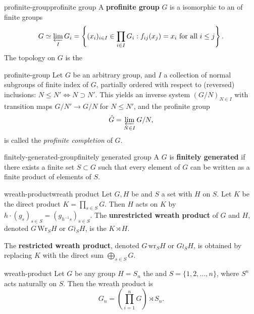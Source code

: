 \begin{topic}{profinite-group}{profinite group}
    A \textbf{profinite group} $G$ is a  isomorphic to an  of  finite groups
    \[ G \simeq \varprojlim_I G_i = \left\{ (x_i)_{i \in I} \in \prod_{i \in I} G_i : f_{ij}(x_j) = x_i \text{ for all } i \le j \right\} . \]
    The topology on $G$ is the  
\end{topic}

\begin{example}{profinite-group}
    Let $G$ be an arbitrary group, and $I$ a collection of normal subgroups of finite index of $G$, partially ordered with respect to (reversed) inclusions: $N \le N' \iff N \supset N'$. This yields an inverse system $(G / N)_{N \in I}$ with transition maps $G/N' \to G/N$ for $N \le N'$, and the profinite group
    \[ \hat{G} = \varprojlim_{N \in I} G / N ,\]
    is called the \textit{profinite completion} of $G$.
\end{example}

\begin{topic}{finitely-generated-group}{finitely generated group}
    A  $G$ is \textbf{finitely generated} if there exists a finite set $S \subset G$ such that every element of $G$ can be written as a finite product of elements of $S$.
\end{topic}

\begin{topic}{wreath-product}{wreath product}
    Let $G, H$ be  and $S$ a set with $H$  on $S$. Let $K$ be the direct product $K = \prod_{s \in S} G$. Then $H$ acts on $K$ by $h \cdot (g_s)_{s \in S} = (g_{h^{-1} s})_{s \in S}$. The \textbf{unrestricted wreath product} of $G$ and $H$, denoted $G \, \text{Wr}_S H$ or $G \overline{\wr}_S H$, is the  $K \rtimes H$.
    
    The \textbf{restricted wreath product}, denoted $G \, \text{wr}_S H$ or $G \wr_S H$, is obtained by replacing $K$ with the direct sum $\bigoplus_{s \in S} G$.
\end{topic}

\begin{example}{wreath-product}
    Let $G$ be any group $H = S_n$ the  and $S = \{ 1, 2, \ldots, n \}$, where $S^n$ acts naturally on $S$. Then the wreath product is
    \[ G_n = \left( \prod_{i = 1}^{n} G \right) \rtimes S_n . \]
\end{example}

